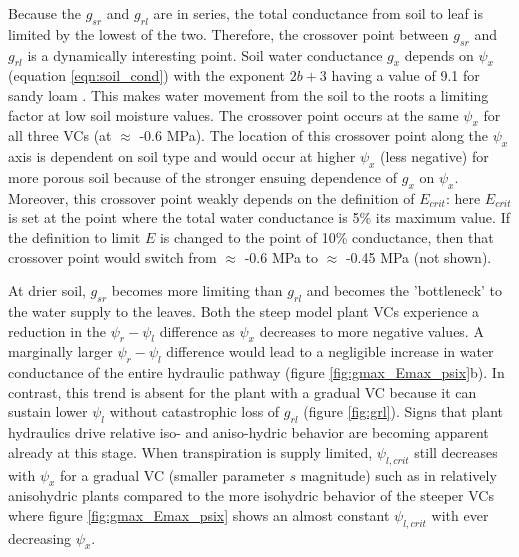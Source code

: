 \documentclass[utf8]{frontiersSCNS} %
\begin{document}
Because the $g_{sr}$ and $g_{rl}$ are in series, the total conductance from soil to leaf is limited by the lowest of the two. Therefore, the crossover point between $g_{sr}$ and $g_{rl}$ is a dynamically interesting point. Soil water conductance $g_x$ depends on $\psi_x$ (equation \ref{eqn:soil_cond}) with the exponent $2b+3$ having a value of 9.1 for sandy loam \citep{campbell_introduction_2012}. This makes water movement from the soil to the roots a limiting factor at low soil moisture values. The crossover point occurs at the same $\psi_x$ for all three VCs (at $\approx$ -0.6 MPa). The location of this crossover point along the $\psi_x$ axis is dependent on soil type and would occur at higher $\psi_x$ (less negative) for more porous soil because of the stronger ensuing dependence of $g_x$ on $\psi_x$. Moreover, this crossover point weakly depends on the definition of $E_{crit}$: here $E_{crit}$ is set at the point where the total water conductance is 5\% its maximum value. If the definition to limit $E$ is changed to the point of 10\% conductance, then that crossover point would switch from $\approx$ -0.6 MPa to $\approx$ -0.45 MPa (not shown).

At drier soil, $g_{sr}$ becomes more limiting than $g_{rl}$ and becomes the 'bottleneck' to the water supply to the leaves. Both the steep model plant VCs experience a reduction in the $\psi_r - \psi_l$ difference as $\psi_x$ decreases to more negative values. A marginally larger $\psi_r - \psi_l$ difference would lead to a negligible increase in water conductance of the entire hydraulic pathway (figure \ref{fig:gmax_Emax_psix}b). In contrast, this trend is absent for the plant with a gradual VC because it can sustain lower $\psi_l$ without catastrophic loss of $g_{rl}$ (figure \ref{fig:grl}). Signs that plant hydraulics drive relative iso- and aniso-hydric behavior are becoming apparent already at this stage. When transpiration is supply limited, $\psi_{l,crit}$ still decreases with $\psi_x$ for a gradual VC (smaller parameter $s$ magnitude) such as in relatively anisohydric plants compared to the more isohydric behavior of the steeper VCs where figure \ref{fig:gmax_Emax_psix} shows an almost constant $\psi_{l,crit}$ with ever decreasing $\psi_x$.

\end{document}
